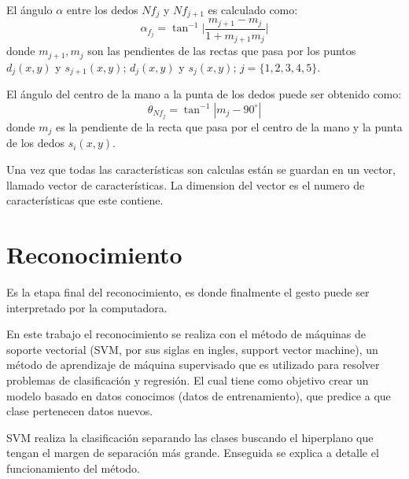 El ángulo $\alpha$ entre los dedos $Nf_j$ y $Nf_{j+1}$ es calculado como:  
$$ \alpha_{f_j} = \tan^{-1}{ \bigg| \frac{m_{j+1}-m_j}{1+m_{j+1}m_j} \bigg|}$$
donde $m_{j+1},m_j$ son las pendientes de las rectas que pasa por los puntos $d_j(x,y)$ y $s_{j+1}(x,y)$; $d_j(x,y)$ y $s_j(x,y)$; $j=\lbrace 1,2,3,4,5 \rbrace$.  

El ángulo del centro de la mano a la punta de los dedos puede ser obtenido como: 
$$ \theta_{Nf_j} = \tan^{-1} | {m_j} - 90^\circ |$$
donde $m_j$ es la pendiente de la recta que pasa por el centro de la mano y la punta de los dedos $s_i(x,y)$.

Una vez que todas las características son calculas están se guardan en un vector, llamado vector de características. La dimension del vector es el numero de características que este contiene. 


\section{Reconocimiento}\label{sec:SVM} 

Es la etapa final del reconocimiento, es donde finalmente el gesto puede ser interpretado por la computadora.  

En este trabajo el reconocimiento se realiza con el método de máquinas de soporte vectorial (SVM, por sus siglas en ingles, support vector machine), un método de aprendizaje de máquina supervisado que es utilizado para resolver problemas de clasificación y regresión. El cual tiene como objetivo crear un modelo basado en datos conocimos (datos de entrenamiento), que predice a que clase pertenecen datos nuevos. 

SVM realiza la clasificación separando las clases buscando el hiperplano que tengan el margen  de separación más grande. Enseguida se explica a detalle el funcionamiento del método. 

